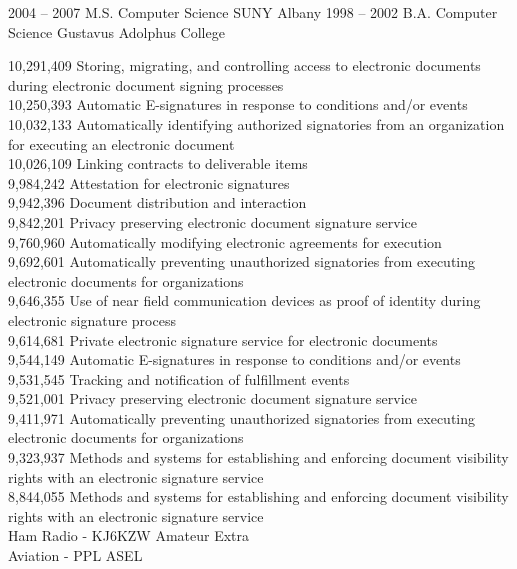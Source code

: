 \documentclass[9pt]{developercv} %
\begin{document}
\begin{entrylist}
	\entry
		{2004 -- 2007}
		{M.S. Computer Science}
	        {SUNY Albany}
                {}
	\entry
		{1998 -- 2002}
		{B.A. Computer Science}
	        {Gustavus Adolphus College}
                {}
\end{entrylist}


10,291,409      Storing, migrating, and controlling access to electronic documents during electronic document signing processes \\
10,250,393      Automatic E-signatures in response to conditions and/or events \\
10,032,133 	Automatically identifying authorized signatories from an organization for executing an electronic document \\
10,026,109	Linking contracts to deliverable items \\
9,984,242	Attestation for electronic signatures \\
9,942,396	Document distribution and interaction \\
9,842,201	Privacy preserving electronic document signature service \\
9,760,960	Automatically modifying electronic agreements for execution \\
9,692,601	Automatically preventing unauthorized signatories from executing electronic documents for organizations \\
9,646,355	Use of near field communication devices as proof of identity during electronic signature process \\
9,614,681	Private electronic signature service for electronic documents \\
9,544,149	Automatic E-signatures in response to conditions and/or events \\ 
9,531,545	Tracking and notification of fulfillment events \\
9,521,001	Privacy preserving electronic document signature service \\
9,411,971	Automatically preventing unauthorized signatories from executing electronic documents for organizations \\
9,323,937	Methods and systems for establishing and enforcing document visibility rights with an electronic signature service \\
8,844,055	Methods and systems for establishing and enforcing document visibility rights with an electronic signature service \\

Ham Radio - KJ6KZW Amateur Extra \\
Aviation - PPL ASEL \\


\end{document}

